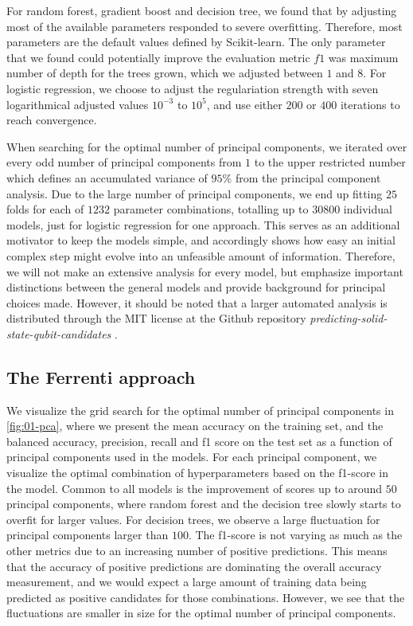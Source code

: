 For random forest, gradient boost and decision tree, we found that by adjusting most of the available parameters responded to severe overfitting. Therefore, most parameters are the default values defined by Scikit-learn. The only parameter that we found could potentially improve the evaluation metric $f1$ was maximum number of depth for the trees grown, which we adjusted between $1$ and $8$. For logistic regression, we choose to adjust the regulariation strength with seven logarithmical adjusted values $10^{-3}$ to $10^{5}$, and use either $200$ or $400$ iterations to reach convergence.

When searching for the optimal number of principal components, we iterated over every odd number of principal components from $1$ to the upper restricted number which defines an accumulated variance of $95\%$ from the principal component analysis. Due to the large number of principal components, we end up fitting $25$ folds for each of $1232$ parameter combinations, totalling up to $30800$ individual models, just for logistic regression for one approach. This serves as an additional motivator to keep the models simple, and accordingly shows how easy an initial complex step might evolve into an unfeasible amount of information. Therefore, we will not make an extensive analysis for every model, but emphasize important distinctions between the general models and provide background for principal choices made. However, it should be noted that a larger automated analysis is distributed through the MIT license at the Github repository \textit{predicting-solid-state-qubit-candidates} \cite{Ohebbi2021}.


\subsection{The Ferrenti approach}

We visualize the grid search for the optimal number of principal components in \autoref{fig:01-pca}, where we present the mean accuracy on the training set, and the balanced accuracy, precision, recall and f1 score on the test set as a function of principal components used in the models. For each principal component, we visualize the optimal combination of hyperparameters based on the f1-score in the model. Common to all models is the improvement of scores up to around $50$ principal components, where random forest and the decision tree slowly starts to overfit for larger values. For decision trees, we observe a large fluctuation for principal components larger than $100$. The f1-score is not varying as much as the other metrics due to an increasing number of positive predictions. This means that the accuracy of positive predictions are dominating the overall accuracy measurement, and we would expect a large amount of training data being predicted as positive candidates for those combinations. However, we see that the fluctuations are smaller in size for the optimal number of principal components.

